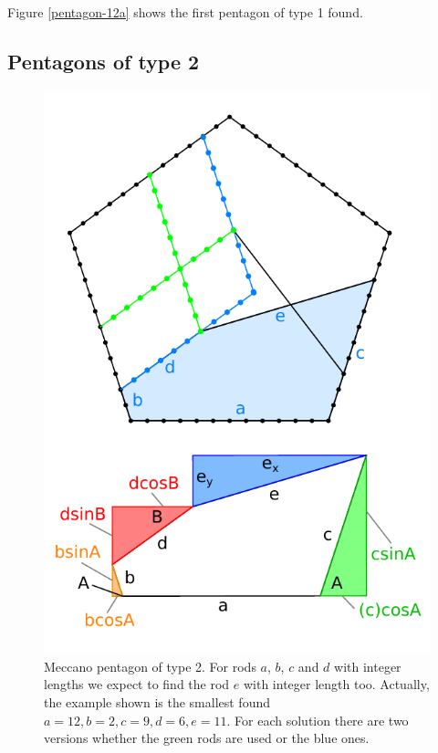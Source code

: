 \documentclass[11pt]{article}
\begin{document}
Figure \ref{pentagon-12a} shows the first pentagon of type 1 found.


\subsection{Pentagons of type 2}

\begin{figure}[htp]
\centering
\includegraphics[scale=1.00]{figs/pentagon-type-2.pdf}
\caption{Meccano pentagon of type 2. For rods $a$, $b$, $c$ and $d$ with integer lengths we expect
to find the rod $e$ with integer length too. Actually, the example shown is the smallest found $a=12, b=2, c=9, d=6, e=11$. For each solution there are two versions whether the green rods are used or the blue ones.}
\label{pentagon-type-2}
\end{figure}
\end{document}
